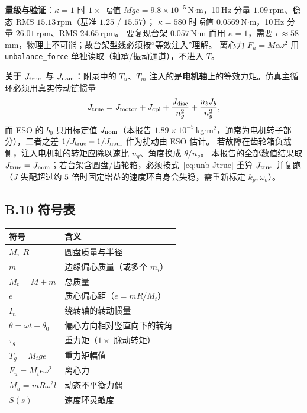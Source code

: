 \textbf{量级与验证}：$\kappa=1$ 时 $1\times$ 幅值 $Mge=9.8\times10^{-5}$\,N$\cdot$m，10\,Hz 分量 $1.09$\,rpm、稳态 RMS $15.13$\,rpm（基准 $1.25$ / $15.57$）；
$\kappa=580$ 时幅值 $0.0569$\,N$\cdot$m，10\,Hz 分量 $26.01$\,rpm、RMS $24.65$\,rpm。
要复现台架 $0.057$\,N$\cdot$m 而用 $\kappa=1$，需要 $e\approx58$\,mm，物理上不可能；故台架型线必须按“等效注入”理解。
离心力 $F_u=Me\omega^2$ 用 \texttt{unbalance\_force} 单独读取（轴承/振动通道），不进入 $T$。

\textbf{关于 $J_{\rm true}$ 与 $J_{\rm nom}$}：附录中的 $T_u$、$T_m$ 注入的是\textbf{电机轴}上的等效力矩。仿真主循环必须用真实传动链惯量
\begin{equation}
J_{\rm true}=J_{\rm motor}+J_{\rm cpl}+\frac{J_{\rm disc}}{n_g^{2}}+\frac{n_bJ_b}{n_g^{2}},
\label{eq:unb-Jtrue}
\end{equation}
而 ESO 的 $b_0$ 只用标定值 $J_{\rm nom}$（本报告 $1.89\times10^{-5}$\,kg$\cdot$m$^2$，通常为电机转子部分），二者之差 $1/J_{\rm true}-1/J_{\rm nom}$ 作为扰动由 ESO 估计。
若故障在齿轮箱负载侧，注入电机轴的转矩应除以速比 $n_g$、角度换成 $\theta/n_g$。
本报告的全部数值结果取 $J_{\rm true}=J_{\rm nom}$；若台架含圆盘/齿轮箱，必须按式~\eqref{eq:unb-Jtrue} 重算 $J_{\rm true}$ 并复跑（$J$ 失配超过约 $5$ 倍时固定增益的速度环自身会失稳，需重新标定 $k_p,\omega_o$）。

\subsection*{B.10 符号表}

\begin{center}\footnotesize
\begin{tabular}{@{}ll@{}}
\toprule
符号 & 含义\\
\midrule
$M,\;R$ & 圆盘质量与半径\\
$m$ & 边缘偏心质量（或多个 $m_i$）\\
$M_t=M+m$ & 总质量\\
$e$ & 质心偏心距（$e=mR/M_t$）\\
$I_n$ & 绕转轴的转动惯量\\
$\theta=\omega t+\theta_0$ & 偏心方向相对竖直向下的转角\\
$\tau_g$ & 重力矩（$1\times$ 脉动转矩）\\
$T_g=M_t g e$ & 重力矩幅值\\
$F_u=M_t e\omega^2$ & 离心力\\
$M_u=mR\omega^2l$ & 动态不平衡力偶\\
$S(s)$ & 速度环灵敏度\\
\bottomrule
\end{tabular}
\end{center}
